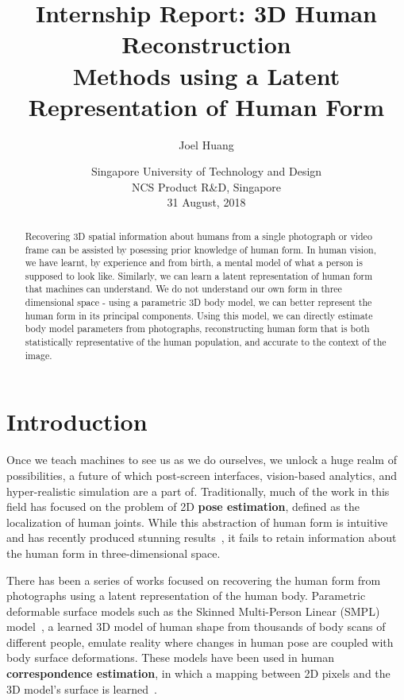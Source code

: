 \documentclass[9pt,twocolumn]{article}
\title{
	Internship Report: 3D Human Reconstruction\\
	Methods using a Latent Representation of Human Form
}
\author{Joel Huang}
\date{
    Singapore University of Technology and Design \\
    NCS Product R\&D, Singapore \\[2ex]
	31 August, 2018
}
\begin{document}
\maketitle

\begin{abstract}
	Recovering 3D spatial information about humans from a single photograph or video frame
	can be assisted by posessing prior knowledge of human form. In human vision, we have
	learnt, by experience and from birth, a mental model of what a person is supposed to
	look like. Similarly, we can learn a latent representation of human form that machines
	can understand. We do not understand our own form in three dimensional space - using a
	parametric 3D body model, we can better represent the human form in its principal components.
	Using this model, we can directly estimate body model parameters from photographs,
	reconstructing human form that is both statistically representative of the human population,
	and accurate to the context of the image.
\end{abstract}

\section{Introduction}

	\par{Once we teach machines to see us as we do ourselves, we unlock a huge realm of
	possibilities, a future of which post-screen interfaces, vision-based analytics,
	and hyper-realistic simulation are a part of. Traditionally, much of the work
	in this field has focused on the problem of 2D \textbf{pose estimation}, defined as the
	localization of human joints. While this abstraction of human form is intuitive
	and has recently produced stunning results~\cite{openpose-paf}, it fails to retain
	information	about the human form in three-dimensional space.}\\

	\par{There has been a series of works focused on recovering the human form from
	photographs using a latent representation of the human body. Parametric	deformable
	surface models such as the Skinned Multi-Person Linear (SMPL) model~\cite{smpl},
	a learned 3D model of human shape from thousands of body scans of different people,
	emulate reality where changes in human pose are coupled with body surface deformations.
	These models have been used in human \textbf{correspondence estimation}, in which
	a mapping between 2D pixels and the 3D model's surface is learned~\cite{densereg,densepose}.}\\
	
\end{document}
